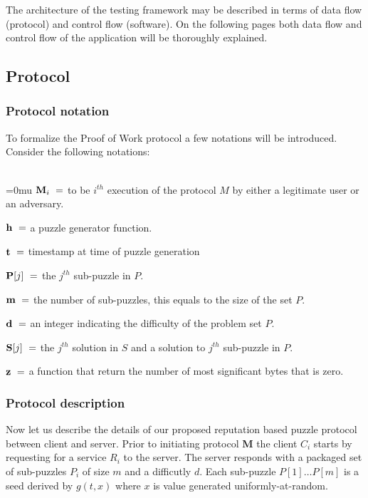 The architecture of the testing framework may be described in terms of data flow (protocol) and control flow (software). On the following pages both data flow and control flow of the application will be thoroughly explained.

\subsection{Protocol}

\subsubsection{Protocol notation}\label{text:protonot}
To formalize the Proof of Work protocol a few notations will be introduced. Consider the following notations:
\\
\\
\indent \begin{minipage}{0.9\linewidth}
\thickmuskip=0mu
${\textbf M_i} \ = $ to be $i^{th}$ execution of the protocol $M$ by either a legitimate user or an adversary. 

${\textbf h} \ = $ a puzzle generator function.

${\textbf t} \ = $ timestamp at time of puzzle generation

${\textbf P[j]} \ = $ the $j^{th}$ sub-puzzle in $P$.

${\textbf m} \ = $ the number of sub-puzzles, this equals to the size of the set $P$. 

${\textbf d} \ = $ an integer indicating the difficulty of the problem set $P$. 

${\textbf S[j]} \ = $ the $j^{th}$ solution in $S$ and a solution to $j^{th}$ sub-puzzle in $P$. 

${\textbf z} \ = $ a function that return the number of most significant bytes that is zero. 
\end{minipage}


\subsubsection{Protocol description}\label{text:protodesc}
Now let us describe the details of our proposed reputation based puzzle protocol between client and server. Prior to initiating protocol \textbf{M} the client $C_i$ starts by requesting for a service $R_i$ to the server. The server responds with a packaged set of sub-puzzles $P_i$ of size $m$ and a difficutly $d$. Each sub-puzzle $P[1] \dots P[m]$ is a seed derived by $g(t,x)$ where $x$ is value generated uniformly-at-random.

